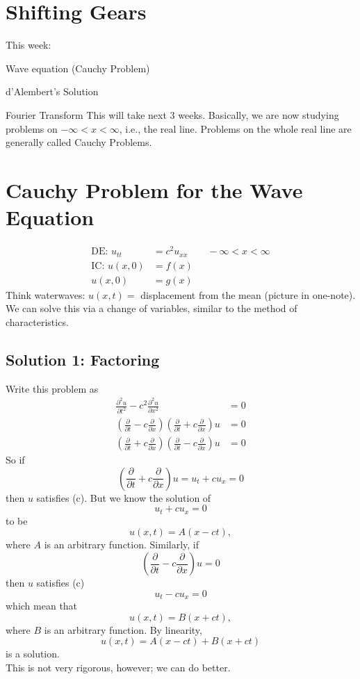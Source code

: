 \documentclass{article}
\begin{document}
\section{Shifting Gears}
This week:
\enum
\item Wave equation (Cauchy Problem)
\item d'Alembert's Solution
\item Fourier Transform
\xenum
This will take next 3 weeks. Basically, we are now studying problems on $-\infty < x < \infty$, i.e., the real line. Problems on the whole real line are generally called Cauchy Problems.

\section{Cauchy Problem for the Wave Equation}
\begin{align*}
\text{DE: } u_{tt} &= c^2u_{xx} \qquad -\infty < x < \infty \\
\text{IC: } u(x,0) &= f(x) \tag{c}\\
						u(x,0) &= g(x)
\end{align*}
Think waterwaves: $u(x,t) = $ displacement from the mean (picture in one-note). We can solve this via a change of variables, similar to the method of characteristics.
\subsection{Solution 1: Factoring}
Write this problem as
\begin{align*}
\frac{\partial^2 u}{\partial t^2} - c^2 \frac{\partial^2 u}{\partial x^2} &= 0 \\
\left(\frac{\partial}{\partial t} - c \frac{\partial}{\partial x}\right)\left( \frac{\partial}{\partial t} + c \frac{\partial}{\partial x}\right)u &= 0 \\
\left(\frac{\partial}{\partial t} + c \frac{\partial}{\partial x}\right)\left(\frac{\partial}{\partial t} - c \frac{\partial}{\partial x}\right)u &= 0
\end{align*}
So if
$$\left( \frac{\partial}{\partial t} + c \frac{\partial}{\partial x}\right) u = u_t + c u_x = 0$$
then $u$ satisfies (c). But we know the solution of $$u_t + c u_x = 0$$ to be $$u(x,t) = A(x-ct),$$ where $A$ is an arbitrary function.
Similarly, if $$\left(\frac{\partial}{\partial t} - c \frac{\partial}{\partial x}\right)u = 0$$ then $u$ satisfies (c) $$u_t - cu_x = 0$$ which mean that $$u(x,t) = B(x+ct),$$ where $B$ is an arbitrary function. By linearity, $$u(x,t) = A(x-ct) + B(x+ct)$$ is a solution.\\
This is not very rigorous, however; we can do better.
\end{document}
